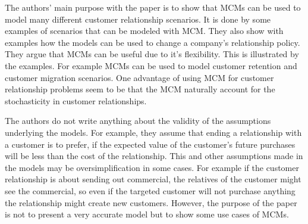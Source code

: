 \documentclass[11pt]{article}
\begin{document}

The authors' main purpose with the paper is to show that MCMs can be used to model many different customer relationship scenarios. It is done by some examples of scenarios that can be modeled with MCM. They also show with examples how the models can be used to change a company's relationship policy. They argue that MCMs can be useful due to it's flexibility. This is illustrated by the examples. For example MCMs can be used to model customer retention and customer migration scenarios. One advantage of using MCM for customer relationship problems seem to be that the MCM naturally account for the stochasticity in customer relationships.

The authors do not write anything about the validity of the assumptions underlying the models. For example, they assume that ending a relationship with a customer is to prefer, if the expected value of the customer's future purchases will be less than the cost of the relationship. This and other assumptions made in the models may be oversimplification in some cases. For example if the customer relationship is about sending out commercial, the relatives of the customer might see the commercial, so even if the targeted customer will not purchase anything the relationship might create new customers. However, the purpose of the paper is not to present a very accurate model but to show some use cases of MCMs.

\end{document}
